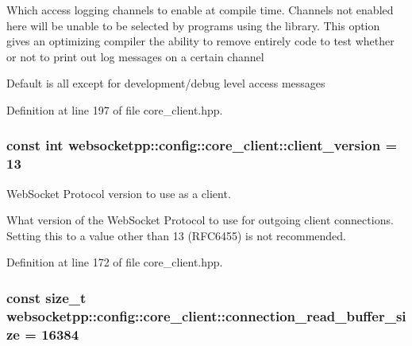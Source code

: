 Which access logging channels to enable at compile time. Channels not enabled here will be unable to be selected by programs using the library. This option gives an optimizing compiler the ability to remove entirely code to test whether or not to print out log messages on a certain channel

Default is all except for development/debug level access messages 

Definition at line 197 of file core\+\_\+client.\+hpp.

\hypertarget{structwebsocketpp_1_1config_1_1core__client_afa438e9269e4bd4bc3815979e0de0083}{}
\subsubsection[{client\+\_\+version}]{\setlength{\rightskip}{0pt plus 5cm}const int websocketpp\+::config\+::core\+\_\+client\+::client\+\_\+version = 13\hspace{0.3cm}{\ttfamily [static]}}\label{structwebsocketpp_1_1config_1_1core__client_afa438e9269e4bd4bc3815979e0de0083}


Web\+Socket Protocol version to use as a client. 

What version of the Web\+Socket Protocol to use for outgoing client connections. Setting this to a value other than 13 (R\+F\+C6455) is not recommended. 

Definition at line 172 of file core\+\_\+client.\+hpp.

\hypertarget{structwebsocketpp_1_1config_1_1core__client_a74305a56f9b85b51caa9efce0de1766e}{}
\subsubsection[{connection\+\_\+read\+\_\+buffer\+\_\+size}]{\setlength{\rightskip}{0pt plus 5cm}const size\+\_\+t websocketpp\+::config\+::core\+\_\+client\+::connection\+\_\+read\+\_\+buffer\+\_\+size = 16384\hspace{0.3cm}{\ttfamily [static]}}\label{structwebsocketpp_1_1config_1_1core__client_a74305a56f9b85b51caa9efce0de1766e}


